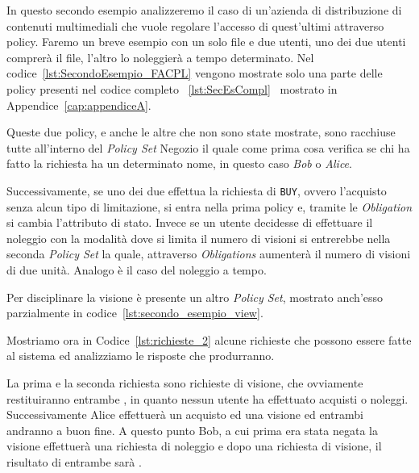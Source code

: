 In questo secondo esempio analizzeremo il caso di un'azienda di distribuzione di contenuti multimediali che vuole regolare l'accesso di quest'ultimi attraverso policy.
Faremo un breve esempio con un solo file e due utenti, uno dei due utenti comprerà il file, l'altro lo noleggierà a tempo determinato.
Nel codice~\ref{lst:SecondoEsempio_FACPL} vengono mostrate solo una parte delle policy presenti nel codice completo ~\ref{lst:SecEsCompl} \ mostrato in Appendice~\ref{cap:appendiceA}.

Queste due policy, e anche le altre che non sono state mostrate, sono racchiuse tutte all'interno del \textit{Policy Set} Negozio il quale come prima cosa verifica se chi ha fatto la richiesta ha un determinato nome, in questo caso \textit{Bob} o \textit{Alice}.\\ \par
Successivamente, se uno dei due effettua la richiesta di \texttt{BUY}, ovvero l'acquisto senza alcun tipo di limitazione, si entra nella prima policy e, tramite le \textit{Obligation} si cambia l'attributo di stato. Invece se un utente decidesse di effettuare il noleggio con la modalità dove si limita il numero di visioni si entrerebbe nella seconda \textit{Policy Set} la quale, attraverso \textit{Obligations} aumenterà il numero di visioni di due unità. Analogo è il caso del noleggio a tempo.\\ \par
Per disciplinare la visione è presente un altro \textit{Policy Set}, mostrato anch'esso parzialmente in codice~\ref{lst:secondo_esempio_view}.

Mostriamo ora in Codice~\ref{lst:richieste_2} alcune richieste che possono essere fatte al sistema ed analizziamo le risposte che produrranno.

La prima e la seconda richiesta sono richieste di visione, che ovviamente restituiranno entrambe \deny, in quanto nessun utente ha effettuato acquisti o noleggi.
Successivamente Alice effettuerà un acquisto ed una visione ed entrambi andranno a buon fine. A questo punto Bob, a cui prima era stata negata la visione effettuerà una richiesta di noleggio e dopo una richiesta di visione, il risultato di entrambe sarà \permit.

